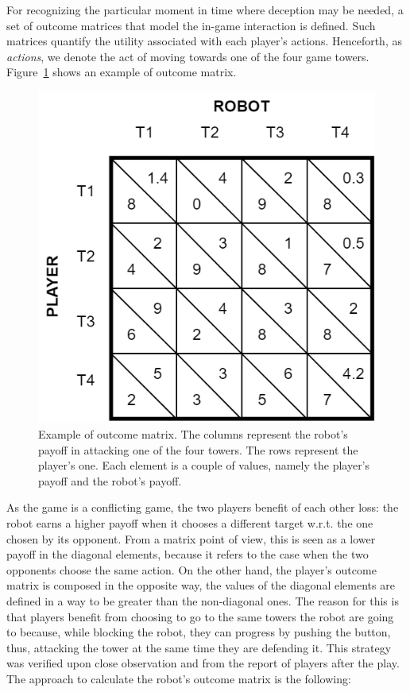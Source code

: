 For recognizing the particular moment in time where deception may be needed, a set of outcome matrices that model the in-game interaction is defined. Such matrices quantify the utility associated with each player's actions. Henceforth, as \textit{actions}, we denote the act of moving towards one of the four game towers. Figure~\ref{fig:matrix} shows an example of outcome matrix.

\begin{figure}[h]
    \centering
    \includegraphics[scale=0.35]{images/06-deception/matrix}
    \caption{Example of outcome matrix. The columns represent the  robot's payoff in attacking one of the four towers. The rows represent the player's one. Each element is a couple of values, namely the player's payoff and the robot's payoff.}
    \label{fig:matrix}
\end{figure}

As the game is a conflicting game, the two players benefit of each other loss: the robot earns a higher payoff when it chooses a different target w.r.t. the one chosen by its opponent. From a matrix point of view, this is seen as a lower payoff in the diagonal elements, because it refers to the case when the two opponents choose the same action. On the other hand, the player's outcome matrix is composed in the opposite way, \ie the values of the diagonal elements are defined in a way to be greater than the non-diagonal ones. The reason for this is that players benefit from choosing to go to the same towers the robot are going to because, while blocking the robot, they can progress by pushing the button, thus, attacking the tower at the same time they are defending it. This strategy was verified upon close observation and from the report of players after the play. The approach to calculate the robot's outcome matrix is the following:

